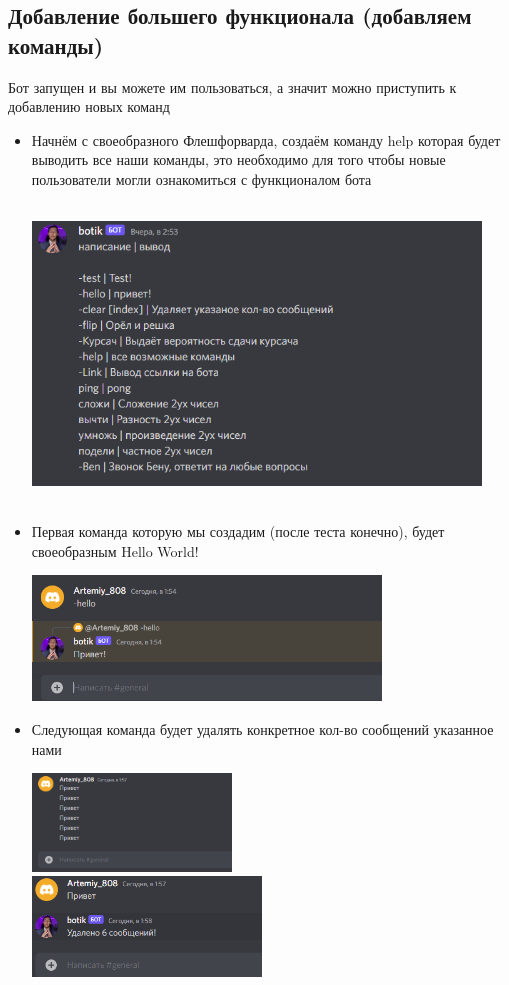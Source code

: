 \documentclass[a4paper,12pt]{article}
\begin{document}
\newpage
\subsection{Добавление большего функционала (добавляем команды)}
Бот запущен и вы можете им пользоваться, а значит можно приступить к добавлению новых команд

\begin{itemize}
    \item Начнём с своеобразного Флешфорварда, создаём команду help которая будет выводить все наши команды, это необходимо для того чтобы новые пользователи могли ознакомиться с функционалом бота
    \centerline{\includegraphics[width = 450px,height = 300px]{pictures/help.png}}
    \item Первая команда которую мы создадим (после теста конечно), будет своеобразным Hello World! \\
    \centerline{\includegraphics[width = 350px]{pictures/hello.png}}
\newpage
    \item Следующая команда будет удалять конкретное кол-во сообщений указанное нами \\
    \centerline{\includegraphics[width = 200px]{pictures/do.png}\\ \includegraphics[width = 230px]{pictures/posle.png}}

\end{itemize}
\end{document}
